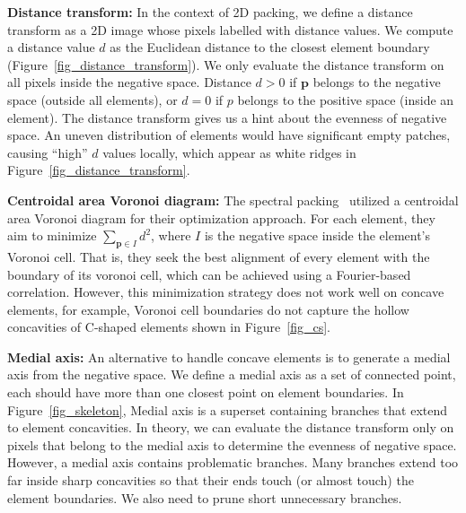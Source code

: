 

\newtext
{
\textbf{Distance transform:} 
In the context of 2D packing, we define a distance transform as a 2D image whose pixels labelled with distance values. 
We compute a distance value $d$ as the Euclidean distance to the closest element boundary (Figure~\ref{fig_distance_transform}).
We only evaluate the distance transform on all pixels inside the negative space.
Distance $d > 0$ if $\bm{p}$ belongs to the negative space (outside all elements), 
or $d = 0$ if $p$ belongs to the positive space (inside an element).
The distance transform gives us a hint about the evenness of negative space.
An uneven distribution of elements would have significant empty patches,
causing ``high'' $d$ values locally, which appear as white ridges in Figure~\ref{fig_distance_transform}.
}


\newtext
{
\textbf{Centroidal area Voronoi diagram:} 
The spectral packing~\cite{Dalal2006} utilized a centroidal area Voronoi diagram for their optimization approach.
For each element, they aim to minimize $\sum_{\bm{p} \in I} d^2$,
where $I$ is the negative space inside the element's Voronoi cell.
That is, they seek the best alignment of every element with the boundary of its voronoi cell,
which can be achieved using a Fourier-based correlation.
However, this minimization strategy does not work well on concave elements, for example, 
Voronoi cell boundaries do not capture the hollow concavities of C-shaped elements shown in Figure~\ref{fig_cs}.
}

\newtext
{
\textbf{Medial axis:}
An alternative to handle concave elements is to generate a medial axis from the negative space.
We define a medial axis as a set of connected point, each should have more than one closest point on element boundaries.
In Figure~\ref{fig_skeleton}, Medial axis is a superset containing branches that extend to element concavities.
In theory, we can evaluate the distance transform only on pixels that belong to the medial axis to determine the evenness of negative space.
However, a medial axis contains problematic branches.
Many branches extend too far inside sharp concavities so that their ends touch (or almost touch) the element boundaries.
We also need to prune short unnecessary branches.
}

